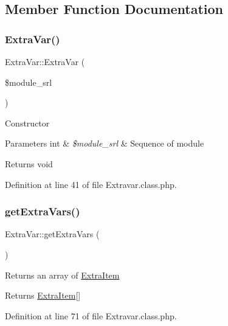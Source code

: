 \subsection{Member Function Documentation}
\mbox{\label{classExtraVar_aa1f0e0f9cf917fde76581b5bf66afe18}} 
\subsubsection{\texorpdfstring{Extra\+Var()}{ExtraVar()}}
{\footnotesize\ttfamily Extra\+Var\+::\+Extra\+Var (\begin{DoxyParamCaption}\item[{}]{\$module\+\_\+srl }\end{DoxyParamCaption})}

Constructor


\begin{DoxyParams}[1]{Parameters}
int & {\em \$module\+\_\+srl} & Sequence of module \\
\hline
\end{DoxyParams}
\begin{DoxyReturn}{Returns}
void 
\end{DoxyReturn}


Definition at line 41 of file Extravar.\+class.\+php.

\mbox{\label{classExtraVar_abe624f7d58678487a37176fe1175a060}} 
\subsubsection{\texorpdfstring{get\+Extra\+Vars()}{getExtraVars()}}
{\footnotesize\ttfamily Extra\+Var\+::get\+Extra\+Vars (\begin{DoxyParamCaption}{ }\end{DoxyParamCaption})}

Returns an array of \hyperlink{classExtraItem}{Extra\+Item}

\begin{DoxyReturn}{Returns}
\hyperlink{classExtraItem}{Extra\+Item}\mbox{[}\mbox{]} 
\end{DoxyReturn}


Definition at line 71 of file Extravar.\+class.\+php.

